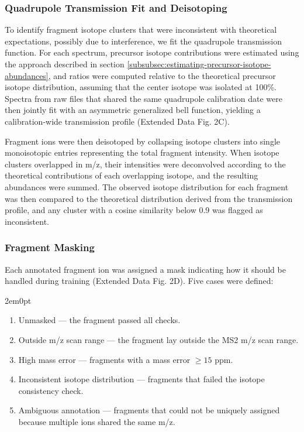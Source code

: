 \documentclass[pdflatex,sn-nature]{sn-jnl}
\begin{document}
\subsubsection{Quadrupole Transmission Fit and Deisotoping}\label{subsubsec:quadrupole-transmission-fit-deisotoping}
To identify fragment isotope clusters that were inconsistent with theoretical expectations, possibly due to interference, we fit the quadrupole transmission function. For each spectrum, precursor isotope contributions were estimated using the approach described in section \ref{subsubsec:estimating-precursor-isotope-abundances}, and ratios were computed relative to the theoretical precursor isotope distribution, assuming that the center isotope was isolated at 100\%. Spectra from raw files that shared the same quadrupole calibration date were then jointly fit with an asymmetric generalized bell function, yielding a calibration-wide transmission profile (Extended Data Fig. 2C).

Fragment ions were then deisotoped by collapsing isotope clusters into single monoisotopic entries representing the total fragment intensity. When isotope clusters overlapped in m/z, their intensities were deconvolved according to the theoretical contributions of each overlapping isotope, and the resulting abundances were summed. The observed isotope distribution for each fragment was then compared to the theoretical distribution derived from the transmission profile, and any cluster with a cosine similarity below 0.9 was flagged as inconsistent.

\subsubsection{Fragment Masking}\label{subsubsec:fragment-masking}
Each annotated fragment ion was assigned a mask indicating how it should be handled during training (Extended Data Fig. 2D). Five cases were defined:

\begin{adjustwidth}{2em}{0pt} %
    \begin{enumerate}
      \item Unmasked --- the fragment passed all checks.
      \item Outside m/z scan range --- the fragment lay outside the MS2 m/z scan range.
      \item High mass error --- fragments with a mass error $\geq15$ ppm.
      \item Inconsistent isotope distribution --- fragments that failed the isotope consistency check.
      \item Ambiguous annotation --- fragments that could not be uniquely assigned because multiple ions shared the same m/z.
    \end{enumerate}
\end{adjustwidth}
	
\end{document}
